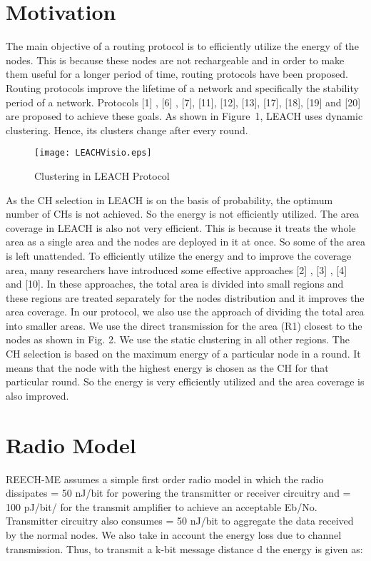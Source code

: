 \documentclass[journal]{IEEEtran}
\begin{document}
\section{Motivation}
The main objective of a routing protocol is to efficiently utilize the energy of the nodes. This is because these nodes are not rechargeable and in order to make them useful for a longer period of time, routing protocols have been proposed. Routing protocols improve the lifetime of a network and specifically the stability period of a network. Protocols [1] , [6] , [7], [11], [12], [13], [17], [18], [19] and [20] are proposed to achieve these goals. As shown in Figure~1, LEACH uses dynamic clustering. Hence, its clusters change after every round.


\begin{figure}[!h]
\centering
\texttt{[image: LEACHVisio.eps]}
\caption{Clustering in LEACH Protocol}
\end{figure}

As the CH selection in LEACH is on the basis of probability, the optimum number of CHs is not achieved. So the energy is not efficiently utilized. The area coverage in LEACH is also not very efficient. This is because it treats the whole area as a single area and the nodes are deployed in it at once. So some of the area is left unattended. To efficiently utilize the energy and to improve the coverage area, many researchers have introduced some effective approaches [2] , [3] , [4] and [10]. In these approaches, the total area is divided into small regions and these regions are treated separately for the nodes distribution and it improves the area coverage. In our protocol, we also use the approach of dividing the total area into smaller areas. We use the direct transmission for the area (R1) closest to the nodes as shown in Fig. 2. We use the static clustering in all other regions. The CH selection is based on the maximum energy of a particular node in a round. It means that the node with the highest energy is chosen as the CH for that particular round. So the energy is very efficiently utilized and the area coverage is also improved.

\section{Radio Model}
  REECH-ME assumes a simple first order radio model in which the radio dissipates  = 50 nJ/bit for powering the transmitter or receiver circuitry and  = 100 pJ/bit/ for the transmit amplifier to achieve an acceptable Eb/No. Transmitter circuitry also consumes  = 50 nJ/bit to aggregate the data received by the normal nodes. We also take in account the  energy loss due to channel transmission. Thus, to transmit a k-bit message distance d the energy is given as:
\end{document}
